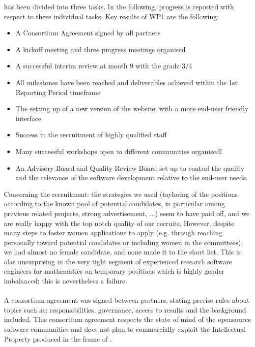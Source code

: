\documentclass{deliverablereport}
\begin{document}
 has been divided into three tasks. In the following, progress is reported with respect to these individual tasks.
Key results of WP1 are the following:

\begin{itemize}
\item{A Consortium Agreement signed by all partners}
\item{A kickoff meeting and three progress meetings organised}
\item{A successful interim review at month 9 with the grade 3/4}
\item{All milestones have been reached and deliverables achieved within the 1st Reporting Period timeframe}
\item{The setting up of a new version of the \ODK website, with a more end-user friendly interface}
\item{Success in the recruitment of highly qualified staff}
\item{Many successful workshops open to different communities organisedl}
\item{An Advisory Board and Quality Review Board set up to control the quality and the relevance of the software development relative to the end-user needs.}
\end{itemize}

Concerning the recruitment: the strategies we used (tayloring of the
positions according to the known pool of potential candidates, in
particular among previous related projects, strong advertisement, ...)
seem to have paid off, and we are really happy with the top notch
quality of our recruits. However, despite many steps to foster women
applications to apply (e.g. through reaching personally toward
potential candidates or including women in the committees), we had
almost no female candidate, and none made it to the short list. This
is alas unsurprising in the very tight segment of experienced research
software engineers for mathematics on temporary positions which is
highly gender imbalanced; this is nevertheless a failure.

\paragraph{}

A consortium agreement was signed
between partners, stating precise rules about topics such as:
responsibilities, governance, access to results and the background
included.  This consortium agreement respects the state of mind of the opensource software communities and does not plan to commercially exploit the Intellectual Property produced in the frame of \ODK.
\end{document}
